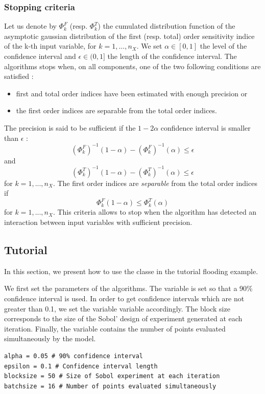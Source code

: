 \documentclass{uncecomp2019}
\begin{document}
\subsubsection{Stopping criteria}

Let us denote by $\Phi_k^F$ (resp. $\Phi_k^T$) the cumulated distribution function of the 
asymptotic gaussian distribution of the first (resp. total) order sensitivity indice of the k-th input 
variable, for $k=1,...,n_X$. 
We set $\alpha\in[0,1]$ the level of the confidence interval and $\epsilon \in(0,1]$ the length 
of the confidence interval. 
The algorithms stops when, on all components, one of the two 
following conditions are satisfied :
\begin{itemize}
\item first and total order indices have been estimated with enough precision or 
\item the first order indices are separable from the total order indices. 
\end{itemize}

The precision is said to be sufficient if the $1-2\alpha$ confidence interval is smaller than 
$\epsilon$ :
$$
(\Phi_k^F)^{-1}(1-\alpha) - (\Phi_k^F)^{-1}(\alpha) \leq \epsilon
$$
and 
$$
(\Phi_k^T)^{-1}(1-\alpha) - (\Phi_k^T)^{-1}(\alpha) \leq \epsilon
$$
for $k=1,...,n_X$.  
The first order indices are \emph{separable} from the total order indices if 
$$
\Phi_k^F(1-\alpha) \leq \Phi_k^T(\alpha)
$$
for $k=1,...,n_X$.  
This criteria allows to stop when the algorithm has detected an interaction 
between input variables with sufficient precision. 


\subsection{Tutorial}

In this section, we present how to use the  classe 
in the tutorial flooding example. 


We first set the parameters of the algorithms. 
The  variable is set so that a 90\% confidence interval is used. 
In order to get confidence intervals which are not greater than 0.1, we set 
the variable  variable accordingly. 
The block size corresponds to the size of the Sobol' design of experiment generated 
at each iteration. 
Finally, the  variable contains the number of points evaluated simultaneously 
by the model. 
\begin{lstlisting}
alpha = 0.05 # 90% confidence interval
epsilon = 0.1 # Confidence interval length
blocksize = 50 # Size of Sobol experiment at each iteration
batchsize = 16 # Number of points evaluated simultaneously
\end{lstlisting}
\end{document}
